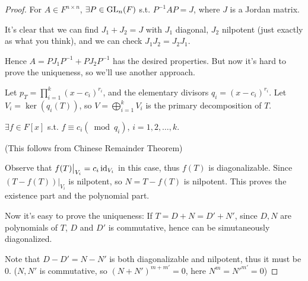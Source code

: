 \begin{proof}[Proof]
    For $A\in F^{n\times n}$, $\exists P\in \mathrm{GL}_n(F)$ s.t. $P^{-1}AP = J$,
	where $J$ is a Jordan matrix.

	It's clear that we can find $J_1 + J_2 = J$ with $J_1$ diagonal, $J_2$ nilpotent
	(just exactly as what you think), and we can check $J_1J_2=J_2J_1$.

	Hence $A = PJ_1P^{-1} + PJ_2P^{-1}$ has the desired properties.
	But now it's hard to prove the uniqueness, so we'll use another approach.

	Let $p_T = \prod_{i=1}^k (x-c_i)^{r_i}$, and the
	elementary divisors $q_{i} = (x-c_i)^{r_i}$.
	Let $V_i = \ker(q_i(T))$, so $V = \bigoplus_{i=1}^k V_i$ is the primary decomposition
	of $T$.
	\begin{claim}
		$\exists f\in F[x]$ s.t. $f\equiv c_i (\bmod q_i)$, $i = 1,2,\dots,k$.
	\end{claim}
	(This follows from Chinese Remainder Theorem)

	Observe that $f(T)\big|_{V_i} = c_i\operatorname{id}_{V_i}$ in this case, thus
	$f(T)$ is diagonalizable.
	Since $(T - f(T))\big|_{V_i}$ is nilpotent, so $N = T - f(T)$ is nilpotent.
	This proves the existence part and the polynomial part.

	Now it's easy to prove the uniqueness:
	If $T = D + N = D' + N'$, since $D,N$ are polynomials of $T$,
	$D$ and $D'$ is commutative, hence can be simutaneously diagonalized.

	Note that $D - D' = N - N'$ is both diagonalizable and nilpotent, thus it must be 0.
	($N,N'$ is commutative, so $(N+N')^{m+m'} = 0$, here $N^m=N'^{m'}=0$)
\end{proof}
